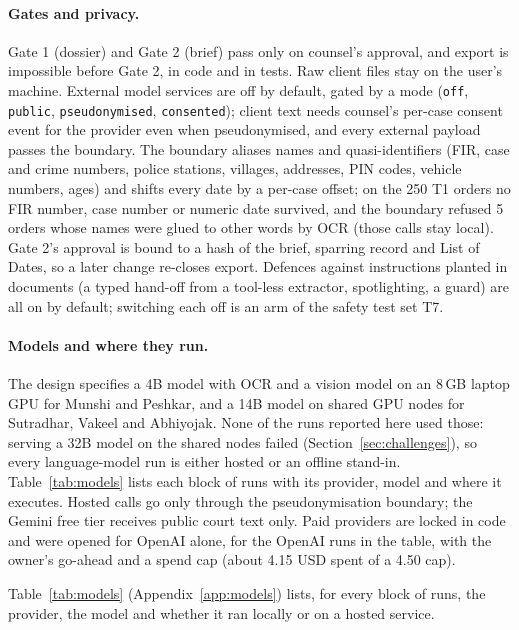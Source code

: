 \paragraph{Gates and privacy.} Gate 1 (dossier) and Gate 2 (brief) pass only on counsel's approval, and export is impossible before Gate 2, in code and in tests. Raw client files stay on the user's machine. External model services are off by default, gated by a mode (\texttt{off}, \texttt{public}, \texttt{pseudonymised}, \texttt{consented}); client text needs counsel's per-case consent event for the provider even when pseudonymised, and every external payload passes the boundary. The boundary aliases names and quasi-identifiers (FIR, case and crime numbers, police stations, villages, addresses, PIN codes, vehicle numbers, ages) and shifts every date by a per-case offset; on the 250 T1 orders no FIR number, case number or numeric date survived, and the boundary refused 5 orders whose names were glued to other words by OCR (those calls stay local). Gate 2's approval is bound to a hash of the brief, sparring record and List of Dates, so a later change re-closes export. Defences against instructions planted in documents (a typed hand-off from a tool-less extractor, spotlighting, a guard) are all on by default; switching each off is an arm of the safety test set T7.

\paragraph{Models and where they run.} The design specifies a 4B model with OCR and a vision model on an 8\,GB laptop GPU for Munshi and Peshkar, and a 14B model on shared GPU nodes for Sutradhar, Vakeel and Abhiyojak. None of the runs reported here used those: serving a 32B model on the shared nodes failed (Section~\ref{sec:challenges}), so every language-model run is either hosted or an offline stand-in. Table~\ref{tab:models} lists each block of runs with its provider, model and where it executes. Hosted calls go only through the pseudonymisation boundary; the Gemini free tier receives public court text only. Paid providers are locked in code and were opened for OpenAI alone, for the OpenAI runs in the table, with the owner's go-ahead and a spend cap (about 4.15 USD spent of a 4.50 cap).

Table~\ref{tab:models} (Appendix~\ref{app:models}) lists, for every block of runs, the provider, the model and whether it ran locally or on a hosted service.
